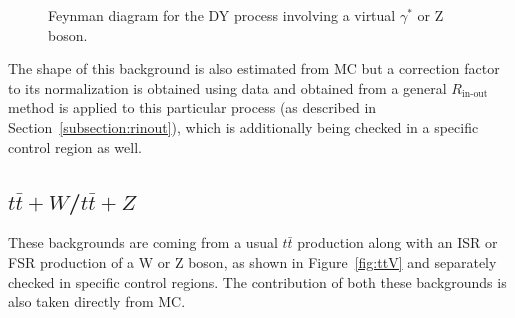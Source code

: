\documentclass[a4paper, 10pt, openright]{report}
\begin{document}
\begin{figure}[htbp]
\centering
\begin{minipage}[b]{.34\textwidth}
\end{minipage} 
\caption{Feynman diagram for the \ac{DY} process involving a virtual $\gamma^*$ or Z boson.}
\label{fig:DY}
\end{figure}

The shape of this background is also estimated from \ac{MC} but a correction factor to its normalization is obtained using data and obtained from a general $R_{\text{in-out}}$ method is applied to this particular process (as described in Section~\ref{subsection:rinout}), which is additionally being checked in a specific control region as well.

\subsection{$t \bar t + W$/$t \bar t + Z$} \label{subsection:ttV}

These backgrounds are coming from a usual $t \bar t$ production along with an \acf{ISR} or \ac{FSR} production of a W or Z boson, as shown in Figure~\ref{fig:ttV} and separately checked in specific control regions. The contribution of both these backgrounds is also taken directly from \ac{MC}.
\end{document}
